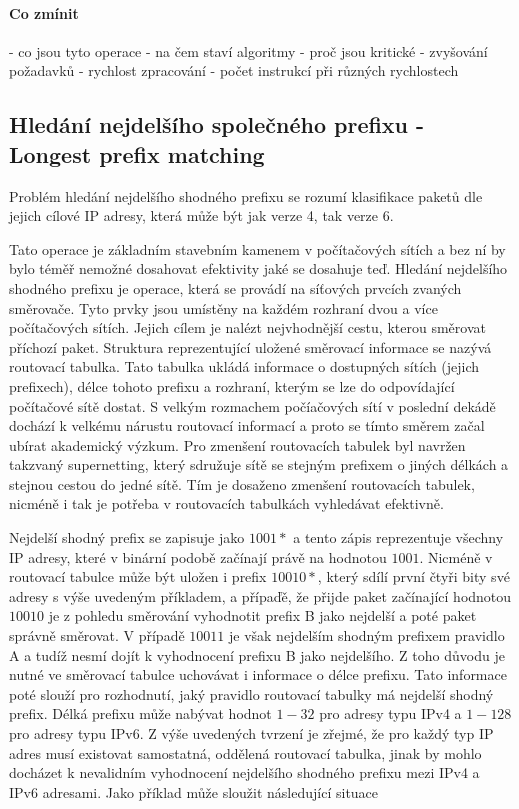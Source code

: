 \paragraph{Co zmínit}
- co jsou tyto operace
- na čem staví algoritmy
- proč jsou kritické
- zvyšování požadavků
- rychlost zpracování
- počet instrukcí při  různých rychlostech

\subsection{Hledání nejdelšího společného prefixu - Longest prefix matching}
Problém hledání nejdelšího shodného prefixu se rozumí klasifikace paketů dle jejich cílové IP adresy,
která může být jak verze 4, tak verze 6.

Tato operace je základním stavebním kamenem v počítačových sítích a bez ní by bylo téměř nemožné dosahovat
efektivity jaké se dosahuje teď. Hledání nejdelšího shodného prefixu je operace, která se provádí
na síťových prvcích zvaných směrovače. Tyto prvky jsou umístěny na každém rozhraní dvou a více
počítačových sítích. Jejich cílem je nalézt nejvhodnější cestu, kterou směrovat příchozí paket.
Struktura reprezentující uložené směrovací informace se nazývá routovací tabulka. Tato tabulka ukládá
informace o dostupných sítích (jejich prefixech), délce tohoto prefixu a rozhraní, kterým se lze
do odpovídající počítačové sítě dostat. S velkým rozmachem počíačových sítí v poslední dekádě
dochází k velkému nárustu routovací informací a proto se tímto směrem začal ubírat akademický výzkum.
Pro zmenšení routovacích tabulek byl navržen takzvaný supernetting, který sdružuje sítě se stejným
prefixem o jiných délkách a stejnou cestou do jedné sítě. Tím je dosaženo zmenšení routovacích tabulek,
nicméně i tak je potřeba v routovacích tabulkách vyhledávat efektivně.

Nejdelší shodný prefix se zapisuje jako $1001*$ a tento zápis reprezentuje všechny IP adresy,
které v binární podobě začínají právě na hodnotou $1001$. Nicméně v routovací tabulce
může být uložen i prefix $10010*$, který sdílí první čtyři bity své adresy s výše uvedeným příkladem,
a přípaďě, že přijde paket začínající hodnotou $10010$ je z pohledu směrování vyhodnotit prefix B jako
nejdelší a poté paket správně směrovat. V případě $10011$ je však nejdelším shodným prefixem pravidlo A
a tudíž nesmí dojít k vyhodnocení prefixu B jako nejdelšího. Z toho důvodu je nutné ve směrovací tabulce
uchovávat i informace o délce prefixu. Tato informace poté slouží pro rozhodnutí, jaký pravidlo
routovací tabulky má nejdelší shodný prefix. Délká prefixu může nabývat hodnot $1-32$ pro adresy typu
IPv4 a $1-128$ pro adresy typu IPv6. Z výše uvedených tvrzení je zřejmé, že pro každý typ
IP adres musí existovat samostatná, oddělená routovací tabulka, jinak by mohlo docházet k nevalidním
vyhodnocení nejdelšího shodného prefixu mezi IPv4 a IPv6 adresami. Jako příklad může sloužit následující
situace

